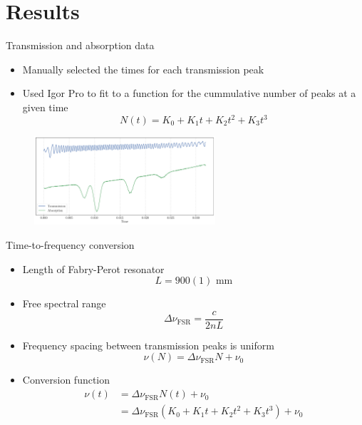 \documentclass{../talk}
\begin{document}
\section{Results}

\begin{frame}{Transmission and absorption data}
  \begin{itemize}
    \item<2-> Manually selected the times for each transmission peak
    \item<3-> Used Igor Pro to fit to a function for the cummulative number of peaks at a given time
      \begin{equation}
        N(t) = K_0 + K_1 t + K_2 t^2 + K_3 t^3
      \end{equation}
  \end{itemize}
  \begin{figure}
    \centering
    \includegraphics[width=0.6\textwidth]{data/time_plot.pdf}
    \caption{}
  \end{figure}
\end{frame}

\begin{frame}{Time-to-frequency conversion}
  \begin{itemize}
    \item<2-> Length of Fabry-Perot resonator
      \begin{equation}
        L = 900(1) \text{ mm}
      \end{equation}
    \item<3-> Free spectral range
      \begin{equation}
        \Delta \nu_\text{FSR} = \frac{c}{2 n L}
      \end{equation}
    \item<4-> Frequency spacing between transmission peaks is uniform
      \begin{equation}
        \nu(N) = \Delta \nu_\text{FSR} N + \nu_0
      \end{equation}
    \item<5-> Conversion function
      \begin{align}
        \nu(t)
        &= \Delta \nu_\text{FSR} N(t) + \nu_0 \\
        &= \Delta \nu_\text{FSR} (K_0 + K_1 t + K_2 t^2 + K_3 t^3) + \nu_0
      \end{align}
  \end{itemize}
\end{frame}
\end{document}
